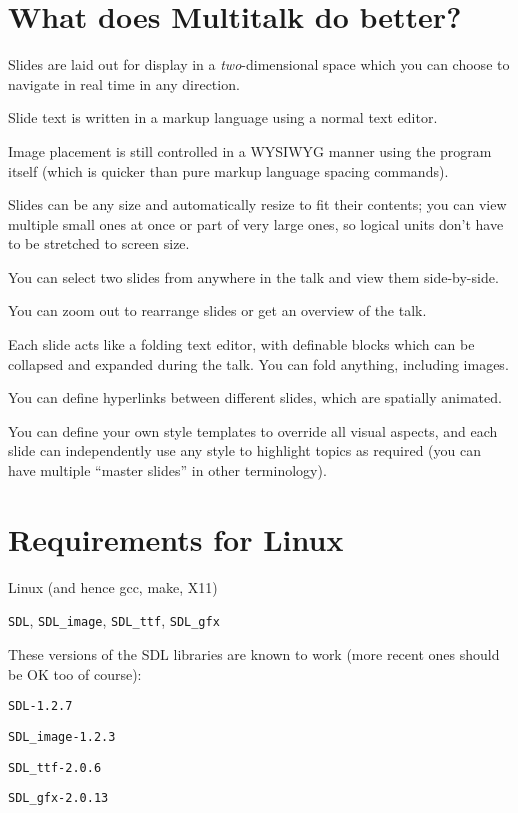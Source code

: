 \documentclass[12pt,a4paper,twoside]{article}
\renewcommand{\_}{\texttt{\symbol{95}}}
\begin{document}
\section{What does Multitalk do better?}

\begin{bulletlist}
\item Slides are laid out for display in a \textit{two}-dimensional space which
  you can choose to navigate in real time in any direction.
\item Slide text is written in a markup language using a normal text editor.
\item Image placement is still controlled in a WYSIWYG manner using the program
  itself (which is quicker than pure markup language spacing commands).
\item Slides can be any size and automatically resize to fit their contents;
  you can view multiple small ones at once or part of very large ones, so
  logical units don't have to be stretched to screen size.
\item You can select two slides from anywhere in the talk and view them
  side-by-side.
\item You can zoom out to rearrange slides or get an overview of the talk.
\item Each slide acts like a folding text editor, with definable blocks
  which can be collapsed and expanded during the talk. You can fold
  anything, including images.
\item You can define hyperlinks between different slides, which are spatially
  animated.
\item You can define your own style templates to override all visual aspects,
  and each slide can independently use any style to highlight topics as
  required (you can have multiple ``master slides'' in other terminology).
\end{bulletlist}

\section{Requirements for Linux}

\begin{bulletlist}
\item Linux (and hence gcc, make, X11)
\item \verb=SDL=, \verb=SDL_image=, \verb=SDL_ttf=, \verb=SDL_gfx=
\end{bulletlist}

These versions of the SDL libraries are known to work
(more recent ones should be OK too of course):
\begin{bulletlist}
\item \verb=SDL-1.2.7=
\item \verb=SDL_image-1.2.3=
\item \verb=SDL_ttf-2.0.6=
\item \verb=SDL_gfx-2.0.13=
\end{bulletlist}
\end{document}

